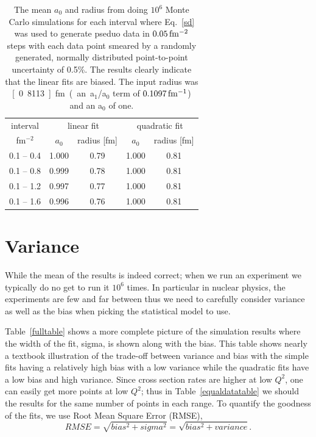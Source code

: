 \documentclass[10pt,aps,prc,twocolumn]{revtex4-1}
\begin{document}
\begin{table}
\caption{The mean $a_0$ and radius from doing $10^6$ Monte Carlo simulations
for each interval
where Eq.~\ref{sd} was used to generate pseduo data in $\unit[0.05]{fm^{-2}}$ steps
with each data point smeared by a randomly generated, normally distributed point-to-point 
uncertainty of 0.5\%.
The results clearly indicate that the linear fits are biased.   The input
radius was \unit[0.8113]{fm} (an a$_1$/a$_0$ term of $\unit[0.1097]{fm^{-1}}$) and an a$_0$ of one.}
\begin{tabular}{c|cc|cc} \hline
interval       & \multicolumn{2}{c|}{linear fit} & \multicolumn{2}{c}{quadratic fit}  \\
fm$^{-2}$      & $a_0$      & radius [fm]          & $a_0$    & radius [fm] \\ \hline
 0.1 -- 0.4 & 1.000& 0.79& 1.000& 0.81 \\
 0.1 -- 0.8 & 0.999& 0.78& 1.000& 0.81 \\
 0.1 -- 1.2 & 0.997& 0.77& 1.000& 0.81 \\
 0.1 -- 1.6 & 0.996& 0.76& 1.000& 0.81 \\ \hline
\end{tabular}
\label{ztable}
\end{table}

\section{Variance}

While the mean of the results is indeed correct; when we run an experiment we typically do no get to run it $10^6$ times.
In particular in nuclear physics, the experiments are few and far between thus we need to carefully consider variance as
well as the bias when picking the statistical model to use.

Table~\ref{fulltable} shows a more complete picture of the simulation results where the width of the fit, sigma, is 
shown along with the bias.
This table shows nearly a textbook illustration of the trade-off between variance and bias with the simple fits
having a relatively high bias with a low variance while the quadratic fits have a low bias and high variance.
Since cross section rates are higher at low $Q^2$, one can easily get more points at low $Q^2$; thus in 
Table~\ref{equaldatatable} we should the results for the same number of points in each range.
To quantify the goodness of the fits, we use Root Mean Square Error (RMSE),
\begin{equation}
RMSE = \sqrt{ bias^2 + sigma^2} = \sqrt{bias^2 + variance}.
\end{equation}
\end{document}
